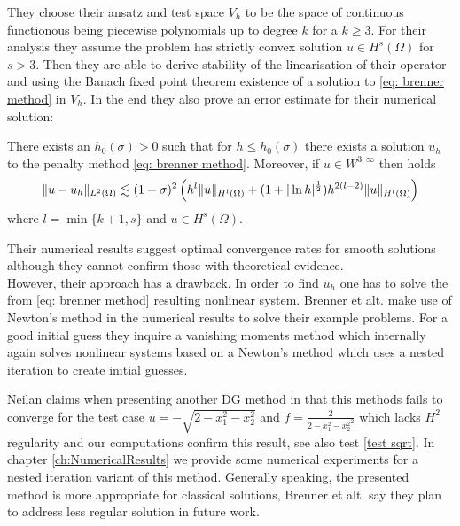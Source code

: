 They choose their ansatz and test space $V_h$ to be the space of continuous functionous being piecewise polynomials up to degree $k$ for a $k \geq 3$. For their analysis they assume the \MA problem has strictly convex solution $u\in H^s(\Omega)$ for $s>3$. Then they are able to derive stability of the linearisation of their operator and using the Banach fixed point theorem existence of a solution to \eqref{eq: brenner method} in $V_h$. In the end they also prove an error estimate for their numerical solution:

\begin{theorem}\label{thm: error estimate brenner}
	There exists an $h_0(\sigma) > 0$ such that for $h \leq h_0(\sigma)$ there exists a solution $u_h$ to the penalty method \eqref{eq: brenner method}. Moreover, if $u \in W^{3,\infty}$ then holds
	\begin{align*}
		\lVert u-u_h \rVert_{L^2(\Omega)} \lesssim (1+\sigma)^2 
		                        \left(h^{l} \lVert u \rVert_{H^l(\Omega)} + (1+ | \ln h |^{\frac 1 2 }) h^{2(l-2)} \lVert u \rVert_{H^l(\Omega)} \right)
	\end{align*}
where $l=\min\{k+1,s\}$ and $u \in H^s(\Omega)$. 
	
\end{theorem}
Their numerical results suggest optimal convergence rates for smooth solutions although they cannot confirm those with theoretical evidence. \\
However, their approach has a drawback. In order to find $u_h$ one has to solve the from \eqref{eq: brenner method} resulting nonlinear system. Brenner et alt. make use of Newton's method in the numerical results to solve their example problems. For a good initial guess they inquire a vanishing moments method which internally again solves nonlinear systems based on a Newton's method which uses a nested iteration to create initial guesses. 

Neilan claims when presenting another DG method in \cite{Neilan2014} that this methods fails to converge for the test case $u = -\sqrt{2 - x_1^2 - x_2^2 }$ and $f = \frac 2 {{2 - x_1^2 - x_2^2}^2}$ which lacks $H^2$ regularity and our computations confirm this result, see also test \ref{test sqrt}. In chapter \ref{ch:NumericalResults} we provide some numerical experiments for a nested iteration variant of this method. Generally speaking, the presented method is more appropriate for classical solutions, Brenner et alt. say they plan to address less regular solution in future work. 


